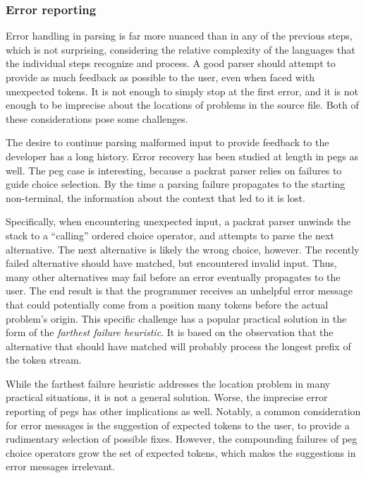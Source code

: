 \subsubsection*{Error reporting}

Error handling in parsing is far more nuanced than in any of the previous steps,
which is not surprising, considering the relative complexity of the languages
that the individual steps recognize and process. A good parser should attempt to
provide as much feedback as possible to the user, even when faced with
unexpected tokens. It is not enough to simply stop at the first error, and it is
not enough to be imprecise about the locations of problems in the source file.
Both of these considerations pose some challenges.

The desire to continue parsing malformed input to provide feedback to the
developer has a long history\cite{graham1975practical}. Error recovery has been
studied at length in \acrlong{peg}s as well\cite{redziejowski2009mouse,
maidl2013exception, demedeiros2016parsing, demedeiros2018syntax,
demedeiros2020automatic}. The \acrshort{peg} case is interesting, because a
packrat parser relies on failures to guide choice selection. By the time a
parsing failure propagates to the starting non-terminal, the information about
the context that led to it is lost.

Specifically, when encountering unexpected input, a packrat parser unwinds the
stack to a ``calling'' ordered choice operator, and attempts to parse the next
alternative. The next alternative is likely the wrong choice, however. The
recently failed alternative should have matched, but encountered invalid input.
Thus, many other alternatives may fail before an error eventually propagates to
the user. The end result is that the programmer receives an unhelpful error
message that could potentially come from a position many tokens before the
actual problem's origin. This specific challenge has a popular practical
solution in the form of the \emph{farthest failure
heuristic}\cite{ford2002packrat-non-func}. It is based on the observation that
the alternative that should have matched will probably process the longest
prefix of the token stream.

While the farthest failure heuristic addresses the location problem in many
practical situations, it is not a general solution. Worse, the imprecise error
reporting of \acrshort{peg}s has other implications as well. Notably, a common
consideration for error messages is the suggestion of expected tokens to the
user, to provide a rudimentary selection of possible fixes. However, the
compounding failures of \acrshort{peg} choice operators grow the set of expected
tokens, which makes the suggestions in error messages irrelevant.

